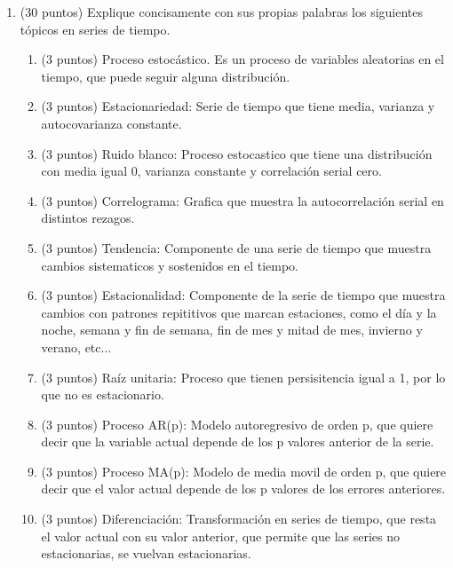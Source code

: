 \documentclass[10pt,a4paper]{article}
\begin{document}
 
\begin{enumerate}

    \item (30 puntos) Explique concisamente con sus propias palabras los siguientes tópicos en series de tiempo.
    \begin{enumerate}
        \item (3 puntos) Proceso estocástico.
        Es un proceso de variables aleatorias en el tiempo, que puede seguir alguna distribución.
        \item (3 puntos) Estacionariedad: Serie de tiempo que tiene  media, varianza y autocovarianza constante.
        \item (3 puntos) Ruido blanco: Proceso estocastico que tiene una distribución con media igual 0, varianza constante y correlación serial cero.
        \item (3 puntos) Correlograma: Grafica que muestra la autocorrelación serial en distintos rezagos.
        \item (3 puntos) Tendencia: Componente de una serie de tiempo que muestra cambios sistematicos y sostenidos en el tiempo.
        \item (3 puntos) Estacionalidad: Componente de la serie de tiempo que muestra cambios con patrones repititivos que marcan estaciones, como el día y la noche, semana y fin de semana, fin de mes y mitad de mes, invierno y verano, etc...
        \item (3 puntos) Raíz unitaria: Proceso que tienen persisitencia igual a 1, por lo que no es estacionario. 
        \item (3 puntos) Proceso AR(p): Modelo autoregresivo de orden p, que quiere decir que la variable actual depende de los p valores anterior de la serie.
        \item (3 puntos) Proceso MA(p): Modelo de media movil de orden p, que quiere decir que el valor actual depende de los p valores de los errores anteriores.
        \item (3 puntos) Diferenciación: Transformación en series de tiempo, que resta el valor actual con su valor anterior, que permite que las series no estacionarias, se vuelvan estacionarias.
    \end{enumerate}


\end{enumerate}
\end{document}
